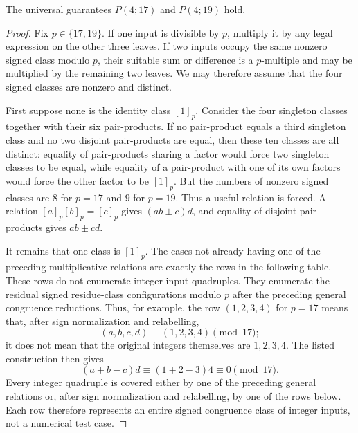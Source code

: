 \begin{theorem}\label{thm:p17p19}
The universal guarantees $P(4;17)$ and $P(4;19)$ hold.
\end{theorem}
\begin{proof}
Fix $p\in\{17,19\}$.  If one input is divisible by $p$, multiply it by any
legal expression on the other three leaves.  If two inputs occupy the same
nonzero signed class modulo $p$, their suitable sum or difference is a
$p$-multiple and may be multiplied by the remaining two leaves.  We may
therefore assume that the four signed classes are nonzero and distinct.

First suppose none is the identity class $[1]_p$.  Consider the four
singleton classes together with their six pair-products.  If no pair-product
equals a third singleton class and no two disjoint pair-products are equal,
then these ten classes are all distinct: equality of pair-products sharing a
factor would force two singleton classes to be equal, while equality of a
pair-product with one of its own factors would force the other factor to be
$[1]_p$.  But the numbers of nonzero signed classes are $8$ for $p=17$ and
$9$ for $p=19$.  Thus a useful relation is forced.  A relation
$[a]_p[b]_p=[c]_p$ gives $(ab\pm c)d$, and equality of disjoint pair-products
gives $ab\pm cd$.

It remains that one class is $[1]_p$.  The cases not already having one of
the preceding multiplicative relations are exactly the rows in the following
table.  These rows do not enumerate integer input quadruples.  They enumerate
the residual signed residue-class configurations modulo $p$ after the preceding
general congruence reductions.  Thus, for example, the row
$(1,2,3,4)$ for $p=17$ means that, after sign normalization and relabelling,
\[
 (a,b,c,d)\equiv(1,2,3,4)\pmod {17};
\]
it does not mean that the original integers themselves are $1,2,3,4$.  The
listed construction then gives
\[
 (a+b-c)d\equiv(1+2-3)4\equiv0\pmod {17}.
\]
Every integer quadruple is covered either by one of the preceding general
relations or, after sign normalization and relabelling, by one of the rows
below.  Each row therefore represents an entire signed congruence class of
integer inputs, not a numerical test case.


\end{proof}
